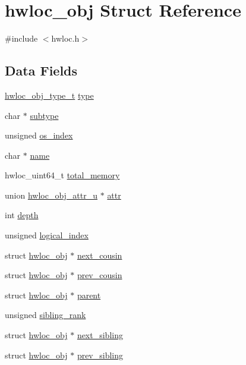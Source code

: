 \hypertarget{a00238}{}\section{hwloc\+\_\+obj Struct Reference}
\label{a00238}


{\ttfamily \#include $<$hwloc.\+h$>$}

\subsection*{Data Fields}
\begin{DoxyCompactItemize}
\item 
\hyperlink{a00184_gacd37bb612667dc437d66bfb175a8dc55}{hwloc\+\_\+obj\+\_\+type\+\_\+t} \hyperlink{a00238_acc4f0803f244867e68fe0036800be5de}{type}
\item 
char $\ast$ \hyperlink{a00238_a5d4f97e76723a9ec8d38046f19e00d33}{subtype}
\item 
unsigned \hyperlink{a00238_a61a7a80a68eaccbaaa28269e678c81a9}{os\+\_\+index}
\item 
char $\ast$ \hyperlink{a00238_abb709ec38f2970677e4e57d1d30be96d}{name}
\item 
hwloc\+\_\+uint64\+\_\+t \hyperlink{a00238_a75603fc36c9284ba48ce814b772a58b6}{total\+\_\+memory}
\item 
union \hyperlink{a00242}{hwloc\+\_\+obj\+\_\+attr\+\_\+u} $\ast$ \hyperlink{a00238_accd40e29f71f19e88db62ea3df02adc8}{attr}
\item 
int \hyperlink{a00238_a4876fd165b4fff35521f07ebd85355ed}{depth}
\item 
unsigned \hyperlink{a00238_a0d07fb7b8935e137c94d75a3eb492ae9}{logical\+\_\+index}
\item 
struct \hyperlink{a00238}{hwloc\+\_\+obj} $\ast$ \hyperlink{a00238_a85a788017457129589318b6c39451acf}{next\+\_\+cousin}
\item 
struct \hyperlink{a00238}{hwloc\+\_\+obj} $\ast$ \hyperlink{a00238_ac715989f55ff5a0eb6be2969ee477ec0}{prev\+\_\+cousin}
\item 
struct \hyperlink{a00238}{hwloc\+\_\+obj} $\ast$ \hyperlink{a00238_adc494f6aed939992be1c55cca5822900}{parent}
\item 
unsigned \hyperlink{a00238_aaa6043eee6f55869933c1d974efd9acd}{sibling\+\_\+rank}
\item 
struct \hyperlink{a00238}{hwloc\+\_\+obj} $\ast$ \hyperlink{a00238_a7f2343ed476fe4942e6fffd4cade1b40}{next\+\_\+sibling}
\item 
struct \hyperlink{a00238}{hwloc\+\_\+obj} $\ast$ \hyperlink{a00238_a7b89e8c189876c0158a9282aaaf17f50}{prev\+\_\+sibling}

\end{DoxyCompactItemize}
